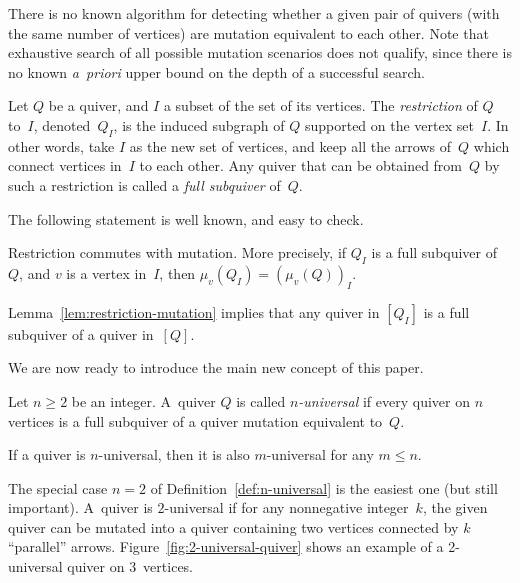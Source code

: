 \documentclass[ALCO,ThmDefs,Unicode,epreuves,published]{cedram}
\begin{document}
\begin{remark}
There is no known algorithm for detecting whether a given pair of quivers (with the same number of vertices) are mutation equivalent to each other. Note that exhaustive search of all possible mutation scenarios does not qualify, since there is no known \emph{a~priori} upper bound on the depth of a successful search. 
\end{remark}

\begin{definition}
\label{def:full-subquiver}
Let $Q$ be a quiver, and $I$ a subset of the set of its vertices. The \emph{restriction} of $Q$ to~$I$, denoted~$Q_I$, is the induced subgraph of $Q$ supported on the vertex set~$I$. In other words, take $I$ as the new set of vertices, and keep all the arrows of~$Q$ which connect vertices in~$I$ to each other. Any quiver that can be obtained from~$Q$ by such a restriction is called a \emph{full subquiver} of~$Q$. 
\end{definition}


The following statement is well known, and easy to check.

\begin{lemma}
\label{lem:restriction-mutation}
Restriction commutes with mutation. More precisely, if $Q_I$ is a full sub\-quiver of~$Q$, and $v$ is a vertex in~$I$, then $\mu_v(Q_I)=(\mu_v(Q))_I$. 
\end{lemma}

Lemma~\ref{lem:restriction-mutation} implies that any quiver in 
$[Q_I]$ is a full subquiver of a quiver in~$[Q]$. 


We are now ready to introduce the main new concept of this paper. 

\begin{definition}
\label{def:n-universal}
Let $n\ge 2$ be an integer. 
A~quiver $Q$ is called \emph{$n$-universal} 
if every quiver on $n$ vertices is a full subquiver of a quiver mutation equivalent to~$Q$. 
\end{definition}

If a quiver is $n$-universal, then it is also $m$-universal for any $m\le n$. 

\begin{example}
The special case $n=2$ of Definition~\ref{def:n-universal} is the easiest one (but still important). A~quiver is $2$-universal if for any nonnegative integer~$k$, the given quiver can be mutated into a quiver containing two vertices connected by $k$ ``parallel'' arrows. 
%
Figure~\ref{fig:2-universal-quiver} shows an example of a 2-universal quiver on $3$~vertices. 
\end{example}
\end{document}
